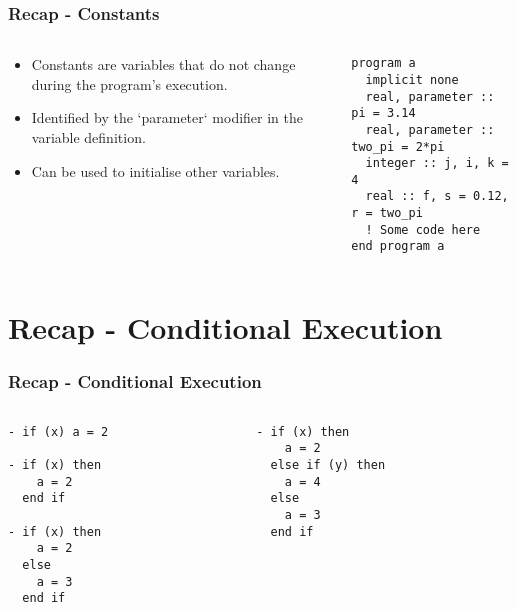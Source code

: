 \documentclass[10pt]{beamer}
\begin{document}
\begin{frame}[fragile]
  \frametitle{Recap - Constants}
  \begin{columns}[T]
    \begin{column}{0.45\textwidth}
      \begin{itemize}
        \item Constants are variables that do not change during the program's execution.
        \item Identified by the `parameter` modifier in the variable definition.
        \item Can be used to initialise other variables.
      \end{itemize}
    \end{column}

    \begin{column}{0.55\textwidth}
      \begin{lstlisting}
program a
  implicit none
  real, parameter :: pi = 3.14
  real, parameter :: two_pi = 2*pi
  integer :: j, i, k = 4
  real :: f, s = 0.12, r = two_pi
  ! Some code here
end program a
      \end{lstlisting}
    \end{column}
  \end{columns}
\end{frame}

\section{Recap - Conditional Execution}

\begin{frame}[fragile]
  \frametitle{Recap - Conditional Execution}
  \begin{columns}[T]
    \begin{column}{0.5\textwidth}
      \begin{lstlisting}
- if (x) a = 2

- if (x) then
    a = 2
  end if

- if (x) then
    a = 2
  else
    a = 3
  end if
      \end{lstlisting}
    \end{column}

    \begin{column}{0.5\textwidth}
      \begin{lstlisting}
- if (x) then
    a = 2
  else if (y) then
    a = 4
  else
    a = 3
  end if
      \end{lstlisting}
    \end{column}
  \end{columns}
\end{frame}
\end{document}
